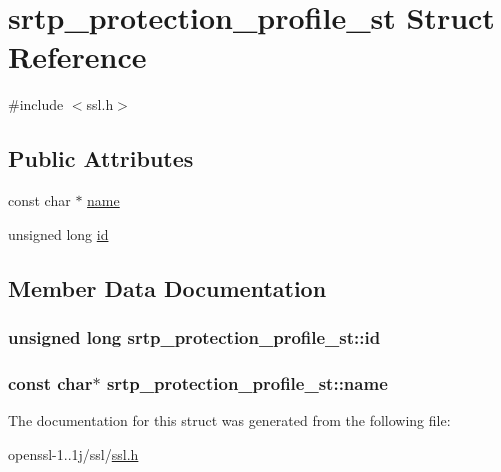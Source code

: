 \hypertarget{structsrtp__protection__profile__st}{\section{srtp\-\_\-protection\-\_\-profile\-\_\-st Struct Reference}
\label{structsrtp__protection__profile__st}
}


{\ttfamily \#include $<$ssl.\-h$>$}

\subsection*{Public Attributes}
\begin{DoxyCompactItemize}
\item 
const char $\ast$ \hyperlink{structsrtp__protection__profile__st_a395750555b1a21494c68b99bea8067e8}{name}
\item 
unsigned long \hyperlink{structsrtp__protection__profile__st_a8befcbb11f8a31c6a75e8d44e5618a00}{id}
\end{DoxyCompactItemize}


\subsection{Member Data Documentation}
\hypertarget{structsrtp__protection__profile__st_a8befcbb11f8a31c6a75e8d44e5618a00}{
\subsubsection[{id}]{\setlength{\rightskip}{0pt plus 5cm}unsigned long srtp\-\_\-protection\-\_\-profile\-\_\-st\-::id}}\label{structsrtp__protection__profile__st_a8befcbb11f8a31c6a75e8d44e5618a00}
\hypertarget{structsrtp__protection__profile__st_a395750555b1a21494c68b99bea8067e8}{
\subsubsection[{name}]{\setlength{\rightskip}{0pt plus 5cm}const char$\ast$ srtp\-\_\-protection\-\_\-profile\-\_\-st\-::name}}\label{structsrtp__protection__profile__st_a395750555b1a21494c68b99bea8067e8}


The documentation for this struct was generated from the following file\-:\begin{DoxyCompactItemize}
\item 
openssl-\/1..\-1j/ssl/\hyperlink{ssl_8h}{ssl.\-h}\end{DoxyCompactItemize}

